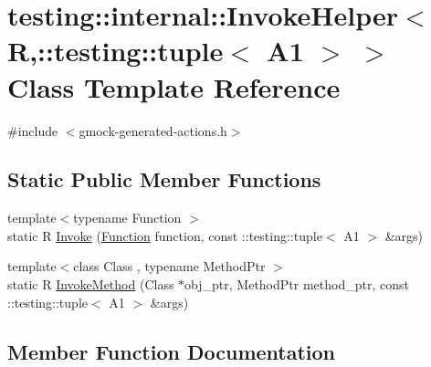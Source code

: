 \hypertarget{classtesting_1_1internal_1_1InvokeHelper_3_01R_00_1_1testing_1_1tuple_3_01A1_01_4_01_4}{}\section{testing\+:\+:internal\+:\+:Invoke\+Helper$<$ R,\+:\+:testing\+:\+:tuple$<$ A1 $>$ $>$ Class Template Reference}
\label{classtesting_1_1internal_1_1InvokeHelper_3_01R_00_1_1testing_1_1tuple_3_01A1_01_4_01_4}


{\ttfamily \#include $<$gmock-\/generated-\/actions.\+h$>$}

\subsection*{Static Public Member Functions}
\begin{DoxyCompactItemize}
\item 
{\footnotesize template$<$typename Function $>$ }\\static R \hyperlink{classtesting_1_1internal_1_1InvokeHelper_3_01R_00_1_1testing_1_1tuple_3_01A1_01_4_01_4_a479bcf0c0dc4205acd354d3ec9646793}{Invoke} (\hyperlink{structtesting_1_1internal_1_1Function}{Function} function, const \+::testing\+::tuple$<$ A1 $>$ \&args)
\item 
{\footnotesize template$<$class Class , typename Method\+Ptr $>$ }\\static R \hyperlink{classtesting_1_1internal_1_1InvokeHelper_3_01R_00_1_1testing_1_1tuple_3_01A1_01_4_01_4_a17192a39bf197683056c490641a57de2}{Invoke\+Method} (Class $\ast$obj\+\_\+ptr, Method\+Ptr method\+\_\+ptr, const \+::testing\+::tuple$<$ A1 $>$ \&args)
\end{DoxyCompactItemize}


\subsection{Member Function Documentation}
